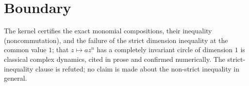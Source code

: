\documentclass[11pt]{article}
\begin{document}
\section{Boundary}

The kernel certifies the exact monomial compositions, their
inequality (noncommutation), and the failure of the strict dimension
inequality at the common value $1$; that $z \mapsto az^n$ has a
completely invariant circle of dimension $1$ is classical complex
dynamics, cited in prose and confirmed numerically.  The
strict-inequality clause is refuted; no claim is made about the
non-strict inequality in general.
\end{document}
